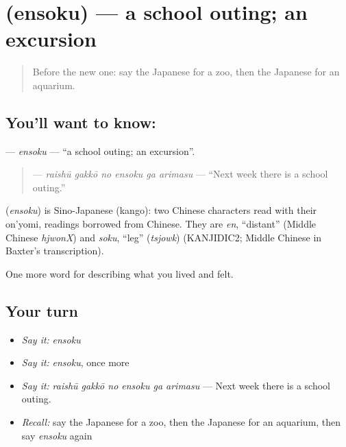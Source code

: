\section[\texorpdfstring{\ja{えんそく} (ensoku)}{えんそく (ensoku)}]{ (ensoku) — a school outing; an excursion}

\label{lesson:JA-C499-ensoku}



\begin{quote}
Before the new one: say the Japanese for a zoo, then the Japanese for an aquarium.
\end{quote}

\subsection*{You'll want to know: }
\textbf{} — \emph{ensoku} — \textquotedblleft{}a school outing; an excursion\textquotedblright{}.

\begin{quote}
\textbf{   } — \emph{raishū gakkō no ensoku ga arimasu} — \textquotedblleft{}Next week there is a school outing.\textquotedblright{}
\end{quote}

\begin{cousinweb}
\textbf{} (\emph{ensoku}) is Sino-Japanese (kango): two Chinese characters read with their on'yomi, readings borrowed from Chinese. They are \emph{en}, \textquotedblleft{}distant\textquotedblright{} (Middle Chinese \emph{hjwonX}) and \emph{soku}, \textquotedblleft{}leg\textquotedblright{} (\emph{tsjowk}) (KANJIDIC2; Middle Chinese in Baxter's transcription).
\end{cousinweb}

\begin{grammarlens}[title={What you've built}]
One more word for describing what you lived and felt.
\end{grammarlens}

\subsection*{Your turn}
\begin{itemize}
\raggedright
  \item \emph{Say it:} \emph{ensoku}
  \item \emph{Say it:} \emph{ensoku}, once more
  \item \emph{Say it:} \emph{raishū gakkō no ensoku ga arimasu} — Next week there is a school outing.
  \item \emph{Recall:} say the Japanese for a zoo, then the Japanese for an aquarium, then say \emph{ensoku} again
\end{itemize}

